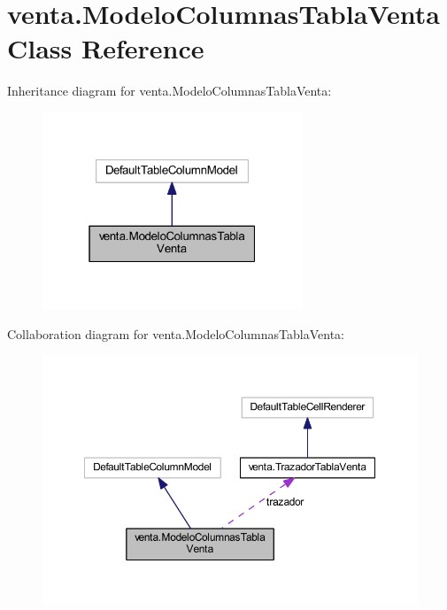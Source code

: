 \hypertarget{classventa_1_1_modelo_columnas_tabla_venta}{}\section{venta.\+Modelo\+Columnas\+Tabla\+Venta Class Reference}
\label{classventa_1_1_modelo_columnas_tabla_venta}


Inheritance diagram for venta.\+Modelo\+Columnas\+Tabla\+Venta\+:
\nopagebreak
\begin{figure}[H]
\begin{center}
\leavevmode
\includegraphics[width=220pt]{classventa_1_1_modelo_columnas_tabla_venta__inherit__graph}
\end{center}
\end{figure}


Collaboration diagram for venta.\+Modelo\+Columnas\+Tabla\+Venta\+:
\nopagebreak
\begin{figure}[H]
\begin{center}
\leavevmode
\includegraphics[width=350pt]{classventa_1_1_modelo_columnas_tabla_venta__coll__graph}
\end{center}
\end{figure}
